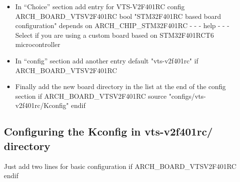 \begin{itemize}
	\item In “Choice” section add entry for VTS-V2F401RC
	\newline config ARCH{\_}BOARD{\_}VTSV2F401RC
	\newline \hspace*{30pt} bool "STM32F401RC based board configuration"
	\newline \hspace*{30pt}depends on ARCH{\_}CHIP{\_}STM32F401RC
	\newline \hspace*{30pt} - - - help - - -
	\newline \hspace*{50pt}Select if you are using a custom board based on STM32F401RCT6 	microcontroller
	
	\item In “config”  section add another entry  
	\newline \hspace*{30pt}default "vts-v2f401rc" if ARCH{\_}BOARD{\_}VTSV2F401RC
	
	\item Finally add the new board directory in the list at the end of the config section
	\newline \hspace*{30pt} if ARCH{\_}BOARD{\_}VTSV2F401RC
	\newline \hspace*{30pt} source "configs/vts-v2f401rc/Kconfig"
	\newline \hspace*{30pt} endif
\end{itemize}

\subsection*{Configuring the Kconfig in vts-v2f401rc/ directory}
Just add two lines for basic configuration
	\newline \hspace*{30pt} if ARCH{\_}BOARD{\_}VTSV2F401RC
	\newline \hspace*{30pt} endif

